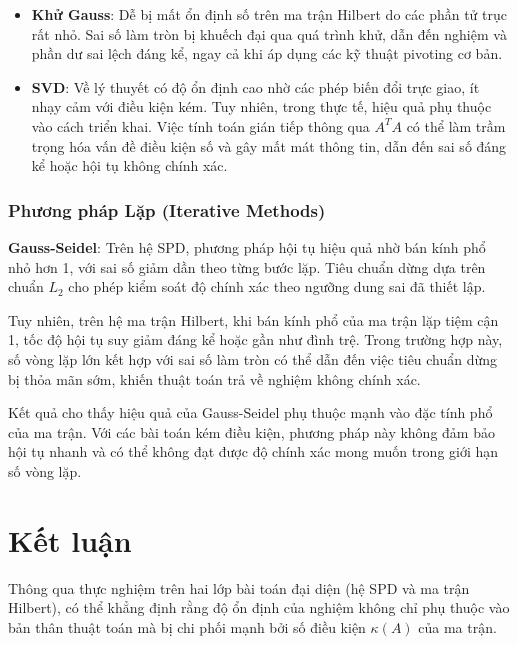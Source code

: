 \begin{itemize}[topsep=0pt, itemsep=2.5pt, leftmargin=1.5cm]
    \item \textbf{Khử Gauss}: Dễ bị mất ổn định số trên ma trận Hilbert do các phần tử trục rất nhỏ. Sai số làm tròn bị khuếch đại qua quá trình khử, dẫn đến nghiệm và phần dư sai lệch đáng kể, ngay cả khi áp dụng các kỹ thuật pivoting cơ bản.
    \item \textbf{SVD}: Về lý thuyết có độ ổn định cao nhờ các phép biến đổi trực giao, ít nhạy cảm với điều kiện kém. Tuy nhiên, trong thực tế, hiệu quả phụ thuộc vào cách triển khai. Việc tính toán gián tiếp thông qua $A^T A$ có thể làm trầm trọng hóa vấn đề điều kiện số và gây mất mát thông tin, dẫn đến sai số đáng kể hoặc hội tụ không chính xác.
\end{itemize}

\newpage

\subsubsection{Phương pháp Lặp (Iterative Methods)}

\textbf{Gauss-Seidel}: Trên hệ SPD, phương pháp hội tụ hiệu quả nhờ bán kính phổ nhỏ hơn 1, với sai số giảm dần theo từng bước lặp. Tiêu chuẩn dừng dựa trên chuẩn $L_2$ cho phép kiểm soát độ chính xác theo ngưỡng dung sai đã thiết lập.

Tuy nhiên, trên hệ ma trận Hilbert, khi bán kính phổ của ma trận lặp tiệm cận 1, tốc độ hội tụ suy giảm đáng kể hoặc gần như đình trệ. Trong trường hợp này, số vòng lặp lớn kết hợp với sai số làm tròn có thể dẫn đến việc tiêu chuẩn dừng bị thỏa mãn sớm, khiến thuật toán trả về nghiệm không chính xác.

Kết quả cho thấy hiệu quả của Gauss-Seidel phụ thuộc mạnh vào đặc tính phổ của ma trận. Với các bài toán kém điều kiện, phương pháp này không đảm bảo hội tụ nhanh và có thể không đạt được độ chính xác mong muốn trong giới hạn số vòng lặp.

\section{Kết luận}

Thông qua thực nghiệm trên hai lớp bài toán đại diện (hệ SPD và ma trận Hilbert), có thể khẳng định rằng độ ổn định của nghiệm không chỉ phụ thuộc vào bản thân thuật toán mà bị chi phối mạnh bởi số điều kiện $\kappa(A)$ của ma trận.

